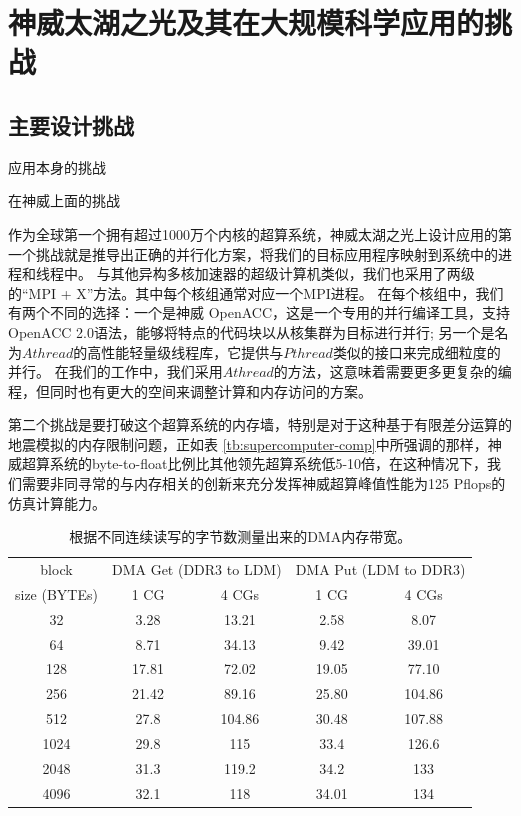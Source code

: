 \documentclass[degree=doctor]{thuthesis}
\begin{document}
\section{神威太湖之光及其在大规模科学应用的挑战}
\label{sec:sunway}



\subsection{主要设计挑战}
\label{sec:sunway-challenge}

应用本身的挑战

在神威上面的挑战

作为全球第一个拥有超过1000万个内核的超算系统，神威太湖之光上设计应用的第一个挑战就是推导出正确的并行化方案，将我们的目标应用程序映射到系统中的进程和线程中。 与其他异构多核加速器的超级计算机类似，我们也采用了两级的“MPI + X”方法。其中每个核组通常对应一个MPI进程。 在每个核组中，我们有两个不同的选择：一个是神威 OpenACC，这是一个专用的并行编译工具，支持OpenACC 2.0语法，能够将特点的代码块以从核集群为目标进行并行; 另一个是名为$ Athread$的高性能轻量级线程库，它提供与$ Pthread $类似的接口来完成细粒度的并行。 在我们的工作中，我们采用$ Athread $的方法，这意味着需要更多更复杂的编程，但同时也有更大的空间来调整计算和内存访问的方案。

第二个挑战是要打破这个超算系统的内存墙，特别是对于这种基于有限差分运算的地震模拟的内存限制问题，正如表 \ref {tb:supercomputer-comp}中所强调的那样，神威超算系统的byte-to-float比例比其他领先超算系统低5-10倍，在这种情况下，我们需要非同寻常的与内存相关的创新来充分发挥神威超算峰值性能为125 Pflops的仿真计算能力。

\begin{table}[ht]
\small
\caption{根据不同连续读写的字节数测量出来的DMA内存带宽。}
\label{tb:sw-bw}
\centering
\begin{tabular}{ccccc}
\hline\hline
  block & \multicolumn{2}{c}{DMA Get (DDR3 to LDM)} & \multicolumn{2}{c}{DMA Put (LDM to DDR3)} \\
  size (BYTEs) & 1 CG & 4 CGs & 1 CG & 4 CGs \\\hline
  32 & 3.28 & 13.21 & 2.58 & 8.07 \\
  64 & 8.71 & 34.13 & 9.42 & 39.01 \\
  128 & 17.81 & 72.02 & 19.05 & 77.10 \\
  256 & 21.42 & 89.16 & 25.80 & 104.86 \\
  512 & 27.8 & 104.86 & 30.48 & 107.88 \\
  1024 & 29.8 & 115 & 33.4 & 126.6 \\
  2048 & 31.3 & 119.2 & 34.2 & 133 \\
  4096 & 32.1 & 118 & 34.01 & 134 \\
  \hline
\end{tabular}
\end{table}
\end{document}
